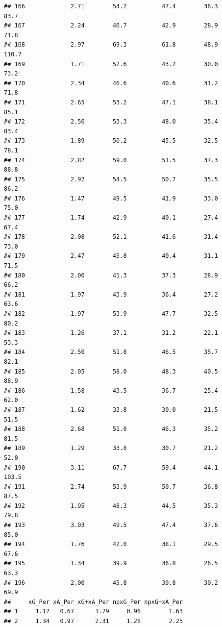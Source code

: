 \documentclass[
]{book}
\theoremstyle{definition}
\theoremstyle{definition}
\theoremstyle{definition}
\theoremstyle{definition}
\theoremstyle{remark}
\begin{document}
\begin{verbatim}
## 166             2.71        54.2          47.4        36.3             83.7
## 167             2.24        46.7          42.9        28.9             71.8
## 168             2.97        69.3          61.8        48.9            110.7
## 169             1.71        52.6          43.2        30.0             73.2
## 170             2.34        46.6          40.6        31.2             71.8
## 171             2.65        53.2          47.1        38.1             85.1
## 172             2.56        53.3          48.0        35.4             83.4
## 173             1.89        50.2          45.5        32.5             78.1
## 174             2.82        59.0          51.5        37.3             88.8
## 175             2.92        54.5          50.7        35.5             86.2
## 176             1.47        49.5          41.9        33.0             75.0
## 177             1.74        42.9          40.1        27.4             67.4
## 178             2.08        52.1          41.6        31.4             73.0
## 179             2.47        45.8          40.4        31.1             71.5
## 180             2.00        41.3          37.3        28.9             66.2
## 181             1.97        43.9          36.4        27.2             63.6
## 182             1.97        53.9          47.7        32.5             80.2
## 183             1.26        37.1          31.2        22.1             53.3
## 184             2.50        51.8          46.5        35.7             82.1
## 185             2.05        58.0          48.3        40.5             88.9
## 186             1.58        43.5          36.7        25.4             62.0
## 187             1.62        33.8          30.0        21.5             51.5
## 188             2.68        51.0          46.3        35.2             81.5
## 189             1.29        33.8          30.7        21.2             52.0
## 190             3.11        67.7          59.4        44.1            103.5
## 191             2.74        53.9          50.7        36.8             87.5
## 192             1.95        48.3          44.5        35.3             79.8
## 193             3.03        49.5          47.4        37.6             85.0
## 194             1.76        42.0          38.1        29.5             67.6
## 195             1.34        39.9          36.8        26.5             63.3
## 196             2.00        45.8          39.8        30.2             69.9
##     xG_Per xA_Per xG+xA_Per npxG_Per npxG+xA_Per
## 1     1.12   0.67      1.79     0.96        1.63
## 2     1.34   0.97      2.31     1.28        2.25

\end{verbatim}
\end{document}
